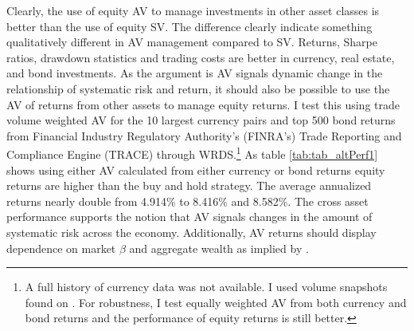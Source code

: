 Clearly, the use of equity AV to manage investments in other asset classes is better than the use of equity SV. The difference clearly indicate something qualitatively different in AV management compared to SV. Returns, Sharpe ratios, drawdown statistics and trading costs are better in currency, real estate, and bond investments. %
As the argument is AV signals dynamic change in the relationship of systematic risk and return, it should also be possible to use the AV of returns from other assets to manage equity returns. I test this using trade volume weighted AV for the 10 largest currency pairs and top 500 bond returns from Financial Industry Regulatory Authority's (FINRA's) Trade Reporting and Compliance Engine (TRACE) through WRDS.\footnote{A full history of currency data was not available. I used volume snapshots found on \citet{most_2013,most_2015,most_2016,most_2018}. For robustness, I test equally weighted AV from both currency and bond returns and the performance of equity returns is still better.} As table \ref{tab:tab_altPerf1} shows using either AV calculated from either currency or bond returns equity returns are higher than the buy and hold strategy. The average annualized returns nearly double from 4.914\% to 8.416\% and 8.582\%. The cross asset performance supports the notion that AV signals changes in the amount of systematic risk across the economy. Additionally, AV returns should display dependence on market $\beta$ and aggregate wealth as implied by \citet{pollet_average_2010}.
